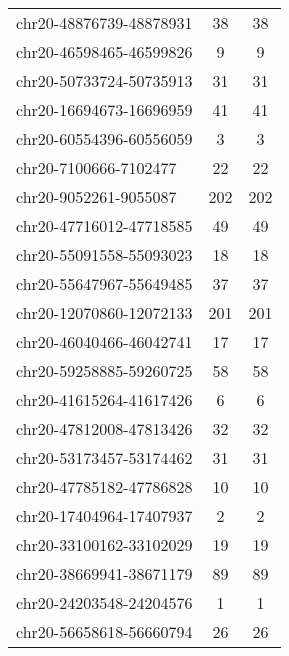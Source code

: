 \begin{longtable}{lSS}
	chr20-48876739-48878931 & 38     & 38                                        \\
	chr20-46598465-46599826 & 9      & 9                                         \\
	chr20-50733724-50735913 & 31     & 31                                        \\
	chr20-16694673-16696959 & 41     & 41                                        \\
	chr20-60554396-60556059 & 3      & 3                                         \\
	chr20-7100666-7102477   & 22     & 22                                        \\
	chr20-9052261-9055087   & 202    & 202                                       \\
	chr20-47716012-47718585 & 49     & 49                                        \\
	chr20-55091558-55093023 & 18     & 18                                        \\
	chr20-55647967-55649485 & 37     & 37                                        \\
	chr20-12070860-12072133 & 201    & 201                                       \\
	chr20-46040466-46042741 & 17     & 17                                        \\
	chr20-59258885-59260725 & 58     & 58                                        \\
	chr20-41615264-41617426 & 6      & 6                                         \\
	chr20-47812008-47813426 & 32     & 32                                        \\
	chr20-53173457-53174462 & 31     & 31                                        \\
	chr20-47785182-47786828 & 10     & 10                                        \\
	chr20-17404964-17407937 & 2      & 2                                         \\
	chr20-33100162-33102029 & 19     & 19                                        \\
	chr20-38669941-38671179 & 89     & 89                                        \\
	chr20-24203548-24204576 & 1      & 1                                         \\
	chr20-56658618-56660794 & 26     & 26                                        \\

\end{longtable}

